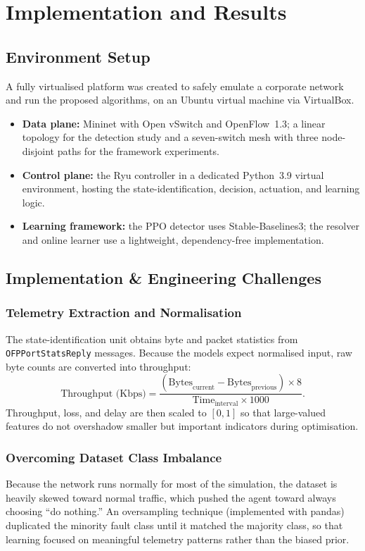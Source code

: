 \documentclass[12pt,a4paper]{report}
\begin{document}
\chapter{Implementation and Results}
\section{Environment Setup}
A fully virtualised platform was created to safely emulate a corporate network and run the
proposed algorithms, on an Ubuntu virtual machine via VirtualBox.
\begin{itemize}
\item \textbf{Data plane:} Mininet with Open vSwitch and OpenFlow~1.3; a linear topology for
the detection study and a seven-switch mesh with three node-disjoint paths for the framework
experiments.
\item \textbf{Control plane:} the Ryu controller in a dedicated Python~3.9 virtual
environment, hosting the state-identification, decision, actuation, and learning logic.
\item \textbf{Learning framework:} the PPO detector uses Stable-Baselines3; the resolver and
online learner use a lightweight, dependency-free implementation.
\end{itemize}

\section{Implementation \& Engineering Challenges}
\subsection{Telemetry Extraction and Normalisation}
The state-identification unit obtains byte and packet statistics from
\texttt{OFPPortStatsReply} messages. Because the models expect normalised input, raw byte
counts are converted into throughput:
\begin{equation}
\text{Throughput (Kbps)} = \frac{(\text{Bytes}_{\text{current}} -
\text{Bytes}_{\text{previous}})\times 8}{\text{Time}_{\text{interval}}\times 1000}.
\end{equation}
Throughput, loss, and delay are then scaled to $[0,1]$ so that large-valued features do not
overshadow smaller but important indicators during optimisation.

\subsection{Overcoming Dataset Class Imbalance}
Because the network runs normally for most of the simulation, the dataset is heavily skewed
toward normal traffic, which pushed the agent toward always choosing ``do nothing.'' An
oversampling technique (implemented with pandas) duplicated the minority fault class until it
matched the majority class, so that learning focused on meaningful telemetry patterns rather
than the biased prior.
\end{document}
